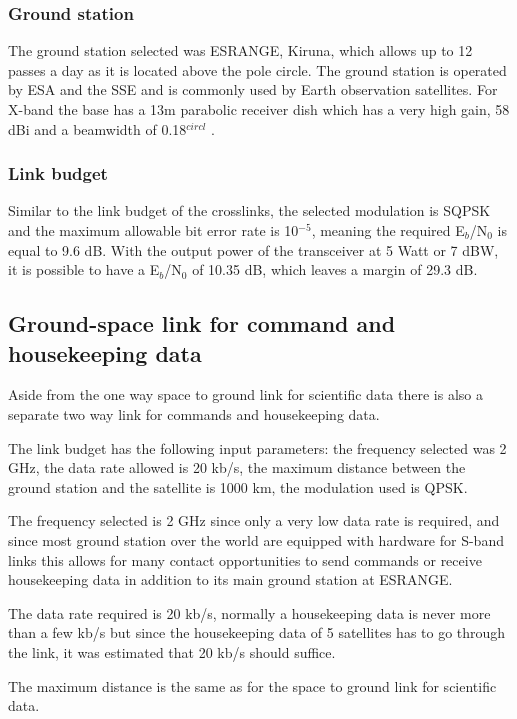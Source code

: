 \subsubsection{Ground station}
The ground station selected was ESRANGE, Kiruna, which allows up to 12 passes a day as it is located above the pole circle. The ground station is operated by ESA and the SSE and is commonly used by Earth observation satellites. For X-band the base has a 13m parabolic receiver dish which has a very high gain, 58 dBi and a beamwidth of 0.18$^{circl}$ \cite{esrange}.

\subsubsection{Link budget}

Similar to the link budget of the crosslinks, the selected modulation is SQPSK and the maximum allowable bit error rate is 10$^{-5}$, meaning the required E$_{b}$/N$_{0}$ is equal to 9.6 dB. With the output power of the transceiver at 5 Watt or 7 dBW, it is possible to have a E$_{b}$/N$_{0}$ of 10.35 dB, which leaves a margin of 29.3 dB.

\subsection{Ground-space link for command and housekeeping data}
Aside from the one way space to ground link for scientific data there is also a separate two way link for commands and housekeeping data. 

The link budget has the following input parameters: the frequency selected was 2 GHz, the data rate allowed is 20 kb/s, the maximum distance between the ground station and the satellite is 1000 km, the modulation used is QPSK.

The frequency selected is 2 GHz since only a very low data rate is required, and since most ground station over the world are equipped with hardware for S-band links this allows for many contact opportunities to send commands or receive housekeeping data in addition to its main ground station at ESRANGE.

The data rate required is 20 kb/s, normally a housekeeping data is never more than a few kb/s\cite{satcom} but since the housekeeping data of 5 satellites has to go through the link, it was estimated that 20 kb/s should suffice.

The maximum distance is the same as for the space to ground link for scientific data.

